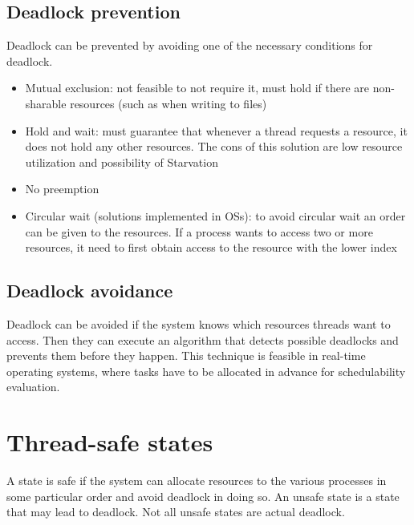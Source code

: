 \subsection{Deadlock prevention}
Deadlock can be prevented by avoiding one of the necessary conditions for deadlock.
\begin{itemize}
    \item Mutual exclusion: not feasible to not require it, must hold if there are non-sharable resources (such as when writing to files)
    \item Hold and wait: must guarantee that whenever a thread requests a resource, it does not hold any other resources. The cons of this solution are low resource utilization and possibility of Starvation
    \item No preemption
    \item Circular wait (solutions implemented in OSs): to avoid circular wait an order can be given to the resources. If a process wants to access two or more resources, it need to first obtain access to the resource with the lower index
\end{itemize}

\subsection{Deadlock avoidance}
Deadlock can be avoided if the system knows which resources threads want to access. Then they can execute an algorithm that detects possible deadlocks and prevents them before they happen. This technique is feasible in real-time operating systems, where tasks have to be allocated in advance for schedulability evaluation.

\section{Thread-safe states}
A state is safe if the system can allocate resources to the various processes in some particular order and avoid deadlock in doing so. An unsafe state is a state that may lead to deadlock. Not all unsafe states are actual deadlock.